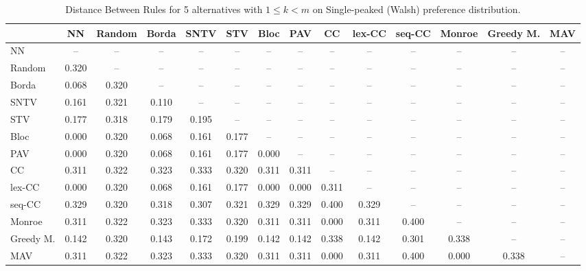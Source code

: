 
\begin{table*}
\centering
\begin{tabular}{lccccccccccccc}
\toprule
 & NN & Random & Borda & SNTV & STV & Bloc & PAV & CC & lex-CC & seq-CC & Monroe & Greedy M. & MAV \\
\midrule
NN & -- & -- & -- & -- & -- & -- & -- & -- & -- & -- & -- & -- & -- \\
Random & 0.320 & -- & -- & -- & -- & -- & -- & -- & -- & -- & -- & -- & -- \\
Borda & 0.068 & 0.320 & -- & -- & -- & -- & -- & -- & -- & -- & -- & -- & -- \\
SNTV & 0.161 & 0.321 & 0.110 & -- & -- & -- & -- & -- & -- & -- & -- & -- & -- \\
STV & 0.177 & 0.318 & 0.179 & 0.195 & -- & -- & -- & -- & -- & -- & -- & -- & -- \\
Bloc & 0.000 & 0.320 & 0.068 & 0.161 & 0.177 & -- & -- & -- & -- & -- & -- & -- & -- \\
PAV & 0.000 & 0.320 & 0.068 & 0.161 & 0.177 & 0.000 & -- & -- & -- & -- & -- & -- & -- \\
CC & 0.311 & 0.322 & 0.323 & 0.333 & 0.320 & 0.311 & 0.311 & -- & -- & -- & -- & -- & -- \\
lex-CC & 0.000 & 0.320 & 0.068 & 0.161 & 0.177 & 0.000 & 0.000 & 0.311 & -- & -- & -- & -- & -- \\
seq-CC & 0.329 & 0.320 & 0.318 & 0.307 & 0.321 & 0.329 & 0.329 & 0.400 & 0.329 & -- & -- & -- & -- \\
Monroe & 0.311 & 0.322 & 0.323 & 0.333 & 0.320 & 0.311 & 0.311 & 0.000 & 0.311 & 0.400 & -- & -- & -- \\
Greedy M. & 0.142 & 0.320 & 0.143 & 0.172 & 0.199 & 0.142 & 0.142 & 0.338 & 0.142 & 0.301 & 0.338 & -- & -- \\
MAV & 0.311 & 0.322 & 0.323 & 0.333 & 0.320 & 0.311 & 0.311 & 0.000 & 0.311 & 0.400 & 0.000 & 0.338 & -- \\
\bottomrule
\end{tabular}

\caption{Distance Between Rules for 5 alternatives with $1 \leq k < m$ on Single-peaked (Walsh) preference distribution.}
\end{table*}
